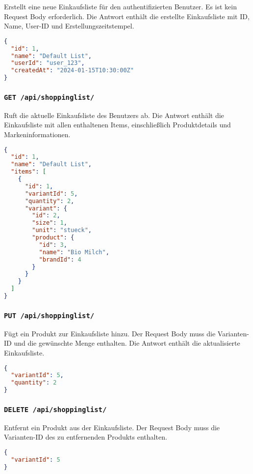 Erstellt eine neue Einkaufsliste für den authentifizierten Benutzer. Es ist kein Request Body erforderlich. Die Antwort enthält die erstellte Einkaufsliste mit ID, Name, User-ID und Erstellungszeitstempel.

\begin{lstlisting}[language=JSON]
{
  "id": 1,
  "name": "Default List",
  "userId": "user_123",
  "createdAt": "2024-01-15T10:30:00Z"
}
\end{lstlisting}

\subsubsection{\texttt{GET /api/shoppinglist/}}

Ruft die aktuelle Einkaufsliste des Benutzers ab. Die Antwort enthält die Einkaufsliste mit allen enthaltenen Items, einschließlich Produktdetails und Markeninformationen.

\begin{lstlisting}[language=JSON]
{
  "id": 1,
  "name": "Default List",
  "items": [
    {
      "id": 1,
      "variantId": 5,
      "quantity": 2,
      "variant": {
        "id": 2,
        "size": 1,
        "unit": "stueck",
        "product": {
          "id": 3,
          "name": "Bio Milch",
          "brandId": 4
        }
      }
    }
  ]
}
\end{lstlisting}

\subsubsection{\texttt{PUT /api/shoppinglist/}}

Fügt ein Produkt zur Einkaufsliste hinzu. Der Request Body muss die Varianten-ID und die gewünschte Menge enthalten. Die Antwort enthält die aktualisierte Einkaufsliste.

\begin{lstlisting}[language=JSON]
{
  "variantId": 5,
  "quantity": 2
}
\end{lstlisting}

\subsubsection{\texttt{DELETE /api/shoppinglist/}}

Entfernt ein Produkt aus der Einkaufsliste. Der Request Body muss die Varianten-ID des zu entfernenden Produkts enthalten.

\begin{lstlisting}[language=JSON]
{
  "variantId": 5
}
\end{lstlisting}

